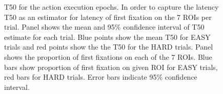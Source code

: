 \begin{figure}[]
    \centering
    \caption[]{ T50 for the action execution epochs. In order to capture the latency T50 as an estimator for latency of first fixation on the 7 ROIs per trial. 
    Panel \protect{} shows the mean and 95\% confidence interval of T50 estimate for each trial. Blue points show the mean T50 for EASY trials and red points show the the T50 for the HARD trials.
    Panel \protect{} shows the proportion of first fixations on each of the 7 ROIs. Blue bars show proportion of first fixation on given ROI for EASY trials, red bars for HARD trials. Error bars indicate 95\% confidence interval.
    }
    \label{figure:t50_subject_exe}
\end{figure}

